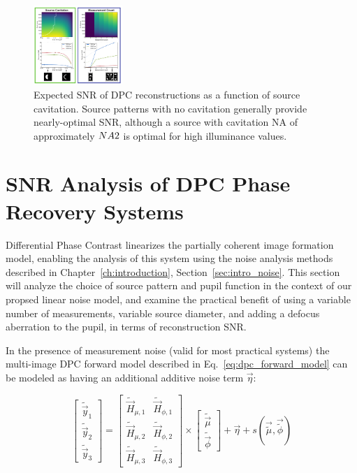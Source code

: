 \begin{figure}
  \label{fig:phase:dpc_cavitation}
  \begin{center}
    \includegraphics[width=0.3\textwidth]{figures/fig_phase_dpc_optimization_cavitation.pdf}
  \end{center}
  \caption{Expected SNR of DPC reconstructions as a function of source cavitation. Source patterns with no cavitation generally provide nearly-optimal SNR, although a source with cavitation NA of approximately $NA \/ 2$ is optimal for high illuminance values.}
\end{figure}

\section{SNR Analysis of DPC Phase Recovery Systems}
Differential Phase Contrast linearizes the partially coherent image formation model, enabling the analysis of this system using the noise analysis methods described in Chapter~\ref{ch:introduction}, Section~\ref{sec:intro_noise}. This section will analyze the choice of source pattern and pupil function in the context of our propsed linear noise model, and examine the practical benefit of using a variable number of measurements, variable source diameter, and adding a defocus aberration to the pupil, in terms of reconstruction SNR.

In the presence of measurement noise (valid for most practical systems) the multi-image DPC forward model described in Eq.~\ref{eq:dpc_forward_model} can be modeled as having an additional additive noise term $\vec{\eta}$:

\begin{equation}
    \label{eq:dpc_forward_model_noise}
    \begin{bmatrix}\tilde{\vec{y}}_1 \\ \tilde{\vec{y}}_2 \\ \tilde{\vec{y}}_3\end{bmatrix} = \begin{bmatrix}\tilde{\vec{H}}_{\mu, 1} & \tilde{\vec{H}}_{\phi, 1}\\ \tilde{\vec{H}}_{\mu, 2} & \tilde{\vec{H}}_{\phi, 2} \\ \tilde{\vec{H}}_{\mu, 3} & \tilde{\vec{H}}_{\phi, 3}\end{bmatrix} \times \begin{bmatrix}\tilde{\vec{\mu}} \\ \tilde{\vec{\phi}}\end{bmatrix} + \vec{\eta} + s(\vec{\tilde{\mu}}, \vec{\tilde{\phi}})
\end{equation}

